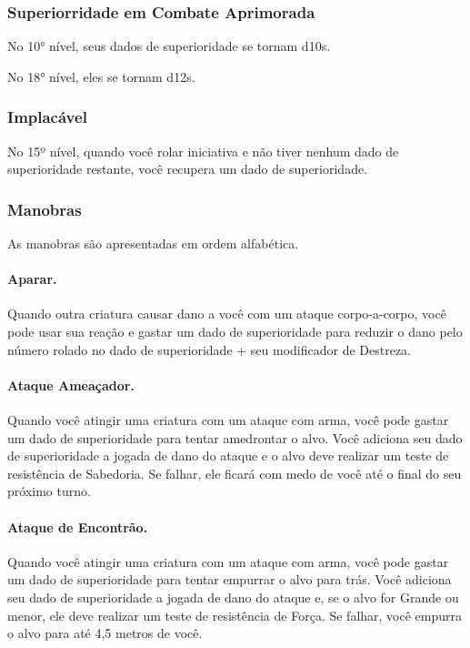 \documentclass{RPG_Adventure}[2021/10/20]
\begin{document}
\begin{multicols}{2}
\subsubsection{Superiorridade em Combate Aprimorada}%

No 10° nível, seus dados de superioridade se tornam d10s.

No 18° nível, eles se tornam d12s.

\subsubsection{Implacável}%

No 15º nível, quando você rolar iniciativa e não tiver nenhum dado de
superioridade restante, você recupera um dado de superioridade.

\subsubsection{Manobras}%

As manobras são apresentadas em ordem alfabética.

\paragraph{Aparar.} Quando outra criatura causar dano a você com um ataque
corpo-a-corpo, você pode usar sua reação e gastar um dado de superioridade para
reduzir o dano pelo número rolado no dado de superioridade + seu modificador de
Destreza.

\paragraph{Ataque Ameaçador.} Quando você atingir uma criatura com um ataque com
arma, você pode gastar um dado de superioridade para tentar amedrontar o alvo.
Você adiciona seu dado de superioridade a jogada de dano do ataque e o alvo deve
realizar um teste de resistência de Sabedoria. Se falhar, ele ficará com medo de
você até o final do seu próximo turno.

\paragraph{Ataque de Encontrão.} Quando você atingir uma criatura com um ataque
com arma, você pode gastar um dado de superioridade para tentar empurrar o alvo
para trás. Você adiciona seu dado de superioridade a jogada de dano do ataque e,
se o alvo for Grande ou menor, ele deve realizar um teste de resistência de
Força. Se falhar, você empurra o alvo para até 4,5 metros de você.


\end{multicols}
\end{document}
